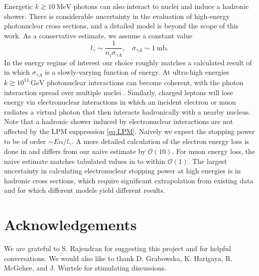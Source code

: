 \documentclass[twocolumn,showpacs,preprintnumbers,amsmath,amssymb,prd]{revtex4}
\newcommand{\OO}{\mathcal{O}}
\begin{document}
\begin{appendices}
Energetic $k \gtrsim 10 ~\text{MeV}$ photons can also interact to nuclei and induce a hadronic shower. There is considerable uncertainty in the evaluation of high-energy photonuclear cross sections, and a detailed model is beyond the scope of this work. As a conservative estimate, we assume a constant value
\begin{equation}
l_\gamma \sim \frac{1}{n_i \sigma_{\gamma A}}, ~~~~ \sigma_{\gamma A} \sim 1 ~\text{mb}.
\end{equation}
In the energy regime of interest our choice roughly matches a calculated result of \cite{Klein} in which $\sigma_{\gamma A}$ is a slowly-varying function of energy. At ultra-high energies $k \gtrsim 10^{14} ~\text{GeV}$ photonuclear interactions can become coherent, with the photon interaction spread over multiple nuclei \cite{PDG}. Similarly, charged leptons will lose energy via electronuclear interactions in which an incident electron or muon radiates a virtual photon that then interacts hadronically with a nearby nucleus. Note that a hadronic shower induced by electronuclear interactions are not affected by the LPM suppression \eqref{eq:LPM}. Naively we expect the stopping power to be of order $\sim E \alpha/l_\gamma$. A more detailed calculation of the electron energy loss is done in \cite{Klein} and differs from our naive estimate by $\OO(10)$. For muon energy loss, the naive estimate matches tabulated values in \cite{PDG} to within $\OO(1)$. The largest uncertainty in calculating electronuclear stopping power at high energies is in hadronic cross sections, which require significant extrapolation from existing data and for which different models yield different results. 

\end{appendices}

\section*{Acknowledgements}
We are grateful to S. Rajendran for suggesting this project and for helpful conversations. We would also like to thank D. Grabowska, K. Harigaya, R. McGehee, and J. Wurtele for stimulating discussions.


\end{document}
